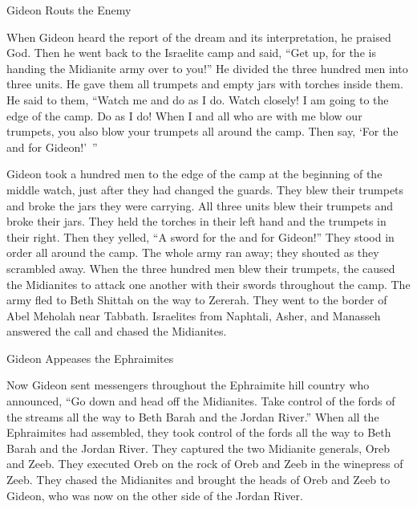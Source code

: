 {\par }{\SH Gideon Routs the Enemy
\par }{\PP {}When
Gideon
heard
the report
of the dream
and its interpretation,
he praised
God. Then he went back
to
the Israelite
camp
and said,
“Get up,
for
the {}
is handing
the Midianite
army over to you!”
He divided
the three
hundred
men
into three
units.
He gave
them all
trumpets
and empty
jars
with torches
inside them.
He said
to
them, “Watch
me
and do as I do.
Watch
closely! I
am
going
to the edge
of the camp.
Do
as I
do!
When
I
and all
who
are with
me blow our
trumpets,
you
also
blow
your
trumpets all
around
the camp.
Then say,
‘For the
{}
and for Gideon!’ ”
\par }{\PP {}Gideon
took
a hundred
men
to
the edge
of the camp
at the beginning
of the middle
watch,
just after
they had changed
the guards.
They blew
their trumpets
and broke
the jars
they were carrying.
All three
units
blew
their trumpets
and broke
their jars.
They held
the torches
in their left hand
and the trumpets
in their right.
Then they yelled,
“A sword
for the
{}
and for Gideon!”
They stood
in order all around
the camp.
The whole
army
ran
away; they shouted
as they scrambled away.
When the three
hundred
men blew
their trumpets,
the {}
caused the Midianites to attack one
another
with their swords
throughout
the camp.
The army
fled
to
Beth Shittah
on the way to Zererah.
They went to
the border
of Abel Meholah
near
Tabbath.
Israelites
from
Naphtali,
Asher,
and Manasseh
answered the call
and chased
the Midianites.
\par }{\SH Gideon Appeases the Ephraimites
\par }{\PP {}Now Gideon
sent
messengers
throughout
the Ephraimite
hill country
who announced,
“Go down
and head off
the Midianites.
Take control
of the fords of the streams
all the way to
Beth Barah
and the Jordan River.”
When all
the Ephraimites
had assembled,
they took control
of the fords
all the way to
Beth Barah
and the Jordan River.
They captured
the two
Midianite
generals,
Oreb
and Zeeb.
They executed
Oreb
on the rock
of Oreb
and Zeeb
in the winepress
of Zeeb.
They chased
the Midianites
and brought
the heads
of Oreb
and Zeeb
to
Gideon,
who was now on the other side
of the Jordan River.

}
